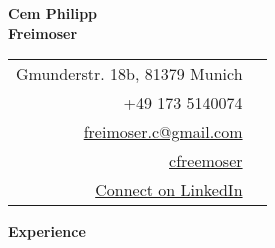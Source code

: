 \documentclass[letterpaper,12pt]{article}
\makeatletter
\def \firstname {Cem Philipp}
\def \lastname {Freimoser}
\def \linkedinicon {\faLinkedin}
\def \linkedintext {/dwight-schrute}
\def \homeicon {\faHome}
\def \hometext {Gmunderstr. 18b, 81379 Munich}
\def \phoneicon {\faPhone}
\def \phonetext {+49 173 5140074}
\def \emailicon {\faEnvelope}
\def \emaillink {mailto:freimoser.c@gmail.com}
\def \emailtext {freimoser.c@gmail.com}
\def \githubicon {\faGithub}
\def \githublink {https://github.com/cfreemoser}
\def \githubtext {cfreemoser}
\def \linkedinicon {\faLinkedin}
\def \linkedlink {https://www.linkedin.com/in/cem-philipp-freimoser-3b885011b/}
\def \linkedintext {Connect on LinkedIn}
\def \phone {\phonetext \hspace{3pt}\phoneicon}
\def \email {\href{\emaillink}{\emailtext} \hspace{3pt}\emailicon}
\def \github {\href{\githublink}{\githubtext} \hspace{3pt}\githubicon}
\def \home {\hometext \hspace{3pt}\homeicon}
\def \linkedin {\href{\linkedlink}{\linkedintext} \hspace{3pt}\linkedinicon}
\renewcommand{\section}[2]{\vspace{5pt}
  \colorbox{teriary}{\color{white}\raggedbottom\normalsize\textbf{{#1}{\hspace{7pt}#2}}}
}
\makeatother
\begin{document}

\vspace{1cm} 
\begin{multicols}{2}
  \vspace{2cm}
  \textbf{\fontsize{28}{36}\selectfont \firstname}\\
  \textbf{\fontsize{28}{36}\selectfont  \lastname}
  
  \columnbreak
  
  \vspace{2cm}
  \begin{flushright}
      \begin{tabular}{rl}
          \home \\
          \phone \\
          \email \\
          \github \\
          \linkedin \\
       \end{tabular}
  \end{flushright}
\end{multicols}
\vspace{1cm}

\section{\faBusinessTime}{Experience}
\end{document}
